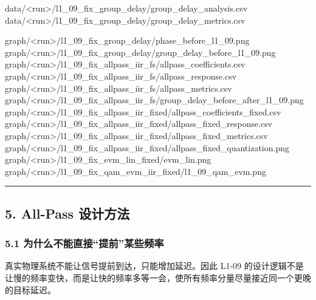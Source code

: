 \documentclass[
]{ctexart}
\newenvironment{Shaded}{}{}
\newcommand{\NormalTok}[1]{#1}
\begin{document}
\begin{Shaded}
\begin{Highlighting}[]
\NormalTok{data/\textless{}run\textgreater{}/l1\_09\_fix\_group\_delay/group\_delay\_analysis.csv}
\NormalTok{data/\textless{}run\textgreater{}/l1\_09\_fix\_group\_delay/group\_delay\_metrics.csv}

\NormalTok{graph/\textless{}run\textgreater{}/l1\_09\_fix\_group\_delay/phase\_before\_l1\_09.png}
\NormalTok{graph/\textless{}run\textgreater{}/l1\_09\_fix\_group\_delay/group\_delay\_before\_l1\_09.png}
\NormalTok{graph/\textless{}run\textgreater{}/l1\_09\_fix\_allpass\_iir\_fs/allpass\_coefficients.csv}
\NormalTok{graph/\textless{}run\textgreater{}/l1\_09\_fix\_allpass\_iir\_fs/allpass\_response.csv}
\NormalTok{graph/\textless{}run\textgreater{}/l1\_09\_fix\_allpass\_iir\_fs/allpass\_metrics.csv}
\NormalTok{graph/\textless{}run\textgreater{}/l1\_09\_fix\_allpass\_iir\_fs/group\_delay\_before\_after\_l1\_09.png}
\NormalTok{graph/\textless{}run\textgreater{}/l1\_09\_fix\_allpass\_iir\_fixed/allpass\_coefficients\_fixed.csv}
\NormalTok{graph/\textless{}run\textgreater{}/l1\_09\_fix\_allpass\_iir\_fixed/allpass\_fixed\_response.csv}
\NormalTok{graph/\textless{}run\textgreater{}/l1\_09\_fix\_allpass\_iir\_fixed/allpass\_fixed\_metrics.csv}
\NormalTok{graph/\textless{}run\textgreater{}/l1\_09\_fix\_allpass\_iir\_fixed/allpass\_fixed\_quantization.png}
\NormalTok{graph/\textless{}run\textgreater{}/l1\_09\_fix\_evm\_lin\_fixed/evm\_lin.png}
\NormalTok{graph/\textless{}run\textgreater{}/l1\_09\_fix\_qam\_evm\_iir\_fixed/l1\_09\_qam\_evm.png}
\end{Highlighting}
\end{Shaded}

\begin{center}\rule{0.5\linewidth}{0.5pt}\end{center}

\subsection{5. All-Pass
设计方法}\label{all-pass-ux8bbeux8ba1ux65b9ux6cd5}

\subsubsection{5.1
为什么不能直接``提前''某些频率}\label{ux4e3aux4ec0ux4e48ux4e0dux80fdux76f4ux63a5ux63d0ux524dux67d0ux4e9bux9891ux7387}

真实物理系统不能让信号提前到达，只能增加延迟。因此 L1-09
的设计逻辑不是让慢的频率变快，而是让快的频率多等一会，使所有频率分量尽量接近同一个更晚的目标延迟。
\end{document}
